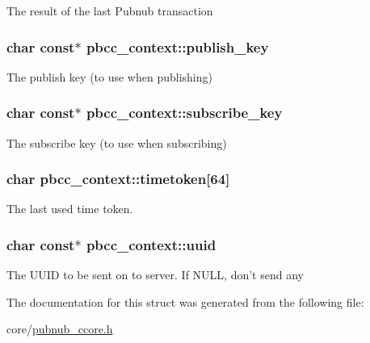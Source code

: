 The result of the last Pubnub transaction \hypertarget{structpbcc__context_a038ce8bdf5339c5170843c1b470fa3c9}{
\subsubsection[{publish\-\_\-key}]{\setlength{\rightskip}{0pt plus 5cm}char const$\ast$ pbcc\-\_\-context\-::publish\-\_\-key}}\label{structpbcc__context_a038ce8bdf5339c5170843c1b470fa3c9}
The publish key (to use when publishing) \hypertarget{structpbcc__context_aea41f2045a1dc83f600a2f7bd032a182}{
\subsubsection[{subscribe\-\_\-key}]{\setlength{\rightskip}{0pt plus 5cm}char const$\ast$ pbcc\-\_\-context\-::subscribe\-\_\-key}}\label{structpbcc__context_aea41f2045a1dc83f600a2f7bd032a182}
The subscribe key (to use when subscribing) \hypertarget{structpbcc__context_a35c520ac999690a71e134dc56340246c}{
\subsubsection[{timetoken}]{\setlength{\rightskip}{0pt plus 5cm}char pbcc\-\_\-context\-::timetoken\mbox{[}64\mbox{]}}}\label{structpbcc__context_a35c520ac999690a71e134dc56340246c}
The last used time token. \hypertarget{structpbcc__context_aa8d0fc21c3ccda3224e890df3a2f7e10}{
\subsubsection[{uuid}]{\setlength{\rightskip}{0pt plus 5cm}char const$\ast$ pbcc\-\_\-context\-::uuid}}\label{structpbcc__context_aa8d0fc21c3ccda3224e890df3a2f7e10}
The U\-U\-I\-D to be sent on to server. If N\-U\-L\-L, don't send any 

The documentation for this struct was generated from the following file\-:\begin{DoxyCompactItemize}
\item 
core/\hyperlink{pubnub__ccore_8h}{pubnub\-\_\-ccore.\-h}\end{DoxyCompactItemize}
